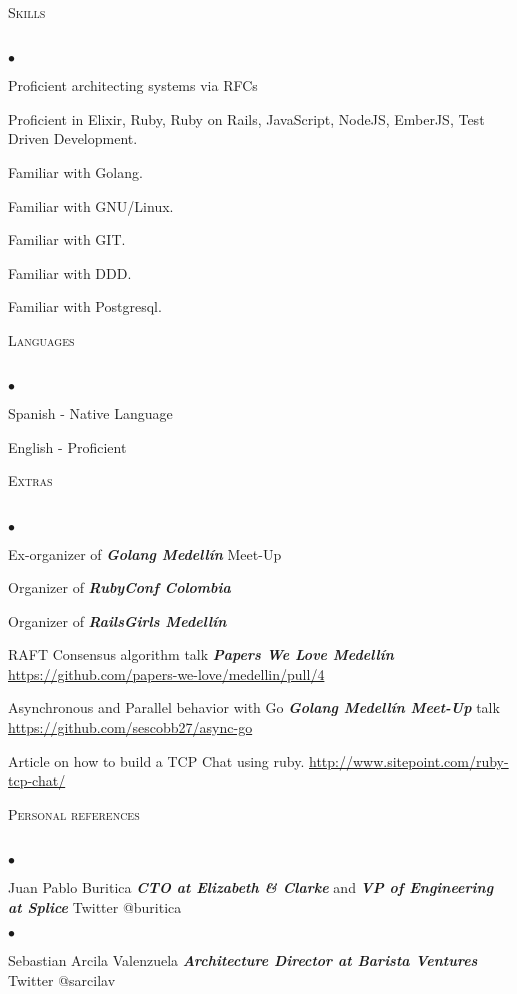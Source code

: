\documentclass[a4paper]{article}
\newcommand{\lineunder}{\vspace*{-8pt} \\ \hspace*{-18pt} \hrulefill \\}
\newcommand{\header}[1]{{\hspace*{-15pt}\vspace*{6pt}
  \textsc{#1}} \vspace*{-6pt} \lineunder}
\newcommand{\employer}[3]{{
  \textbf{#1} (#2)\\ \underline{\textbf{\emph{#3}}}\\ }}
\newenvironment{achievements}{\begin{list}{$\bullet$}{\topsep 0pt \itemsep
  -2pt}}{\vspace*{4pt}\end{list}}
\newcommand{\emphasys}[1]{\textbf{\emph{#1}}}
\begin{document}
  \header{Skills}
  \begin{achievements}
  \item {Proficient architecting systems via RFCs}
  \item {Proficient in Elixir, Ruby, Ruby on Rails, JavaScript, NodeJS, EmberJS, Test Driven Development.}
  \item {Familiar with Golang.}
  \item {Familiar with GNU/Linux.}
  \item {Familiar with GIT.}
  \item {Familiar with DDD.}
  \item {Familiar with Postgresql.}
  \end{achievements}
  \header{Languages}
  \begin{achievements}
  \item{Spanish - Native Language}
  \item{English - Proficient}
  \end{achievements}

  \header{Extras}
  \begin{achievements}
  \item{Ex-organizer of \emphasys{Golang Medell\'in} Meet-Up}
  \item{Organizer of \emphasys{RubyConf Colombia}}
  \item{Organizer of \emphasys{RailsGirls Medell\'in}}
  \item{RAFT Consensus algorithm talk \emphasys{Papers We Love Medell\'in} \url{https://github.com/papers-we-love/medellin/pull/4}}
  \item{Asynchronous and Parallel behavior with Go \emphasys{Golang Medell\'in Meet-Up} talk \url{https://github.com/sescobb27/async-go}}
  \item{Article on how to build a TCP Chat using ruby. \url{http://www.sitepoint.com/ruby-tcp-chat/}}
  \end{achievements}


  \header{Personal references}
  \begin{achievements}
  \item{Juan Pablo Buritica \emphasys{CTO at Elizabeth \& Clarke} and \emphasys{VP of Engineering at Splice} Twitter @buritica}
  \end{achievements}
  \begin{achievements}
  \item{Sebastian Arcila Valenzuela \emphasys{Architecture Director at Barista Ventures} Twitter @sarcilav}
  \end{achievements}
  
\end{document}
